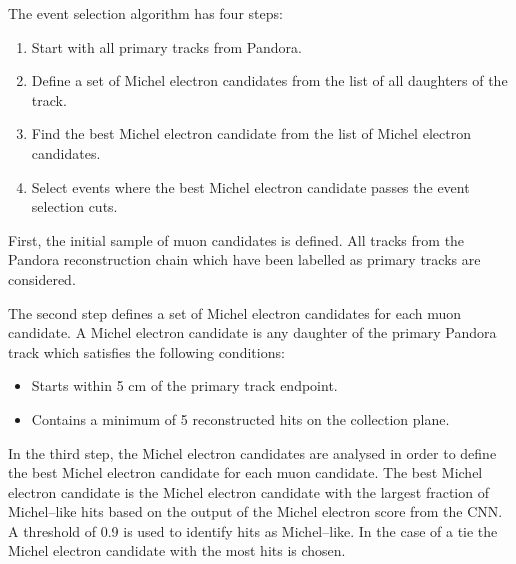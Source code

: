 The event selection algorithm has four steps:
\begin{enumerate}
	\item Start with all primary tracks from Pandora.
	\item Define a set of Michel electron candidates from the list of all
		daughters of the track.
	\item Find the best Michel electron candidate from the list of Michel electron
		candidates.
	\item Select events where the best Michel electron candidate passes the event
		selection cuts.
\end{enumerate}

First, the initial sample of muon candidates is defined. All tracks from the 
Pandora reconstruction chain which have been labelled as primary tracks are 
considered.

The second step defines a set of Michel electron candidates for each muon
candidate. A Michel electron candidate is any daughter of the primary Pandora
track which satisfies the following conditions:
\begin{itemize}
	\item Starts within 5 cm of the primary track endpoint.
	\item Contains a minimum of 5 reconstructed hits on the collection plane.
\end{itemize}

In the third step, the Michel electron candidates are analysed in order to 
define the best Michel electron candidate for each muon candidate. The best 
Michel electron candidate is the Michel electron candidate with the largest 
fraction of Michel--like hits based on the output of the Michel electron score 
from the CNN. A threshold of 0.9 is used to identify hits as Michel--like. In 
the case of a tie the Michel electron candidate with the most hits is chosen.

